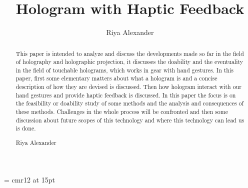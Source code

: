 \documentclass{fisatproject}
\title{Hologram with Haptic Feedback}
\author{Riya Alexander}
\begin{document}
\maketitle
\makecert
\font\secfont =  cmr12 at 15pt
\newpage
{}
\setcounter{page}{1}
\thispagestyle{plain}
\renewcommand\abstractname{ABSTRACT}
\begin{abstract}
\vspace{5cm}
This paper is intended to analyze and discuss the developments made so far in the field of holography and holographic projection, it discusses the doability and the eventuality in the field of touchable holograms, which works in gear with hand gestures. In this paper, first some elementary matters about what a hologram is and a concise description of how they are devised is discussed. Then how hologram interact with our hand gestures and provide haptic feedback is discussed. In this paper the focus is on the feasibility or doability study of some methods and the analysis and consequences of these methods. Challenges in the whole process will be confronted and then some discussion about future scopes of this technology and where this technology can lead us is done.
\end{abstract}



\newpage
\renewcommand\abstractname{Contribution by Author}
\thispagestyle{plain}
\begin{abstract}
\vspace{5cm}

\vspace{1cm}
\begin{flushright}
Riya Alexander
\end{flushright}
\end{abstract}
\end{document}
